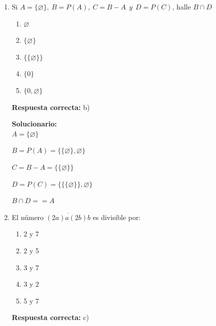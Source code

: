 \begin{enumerate}
	Sea la cantidad repartida
	
	\[
	T
	\left\{
	\begin{array}{c}
		\dfrac{A}{n+1}=\dfrac{B}{n}=\dfrac{C}{n-1}\\
	\end{array}
	\right.
	\]
	
	donde:
	
	$C=44\% (A+B)$
	
	$\dfrac{A+B}{n+1+n}=\dfrac{44\%(A+B)}{n-1}\Rightarrow n=12$
	
	También:
	
	$C=A-200$
	
	$\dfrac{A}{13}=\dfrac{C}{11}=\dfrac{A-C}{13-11}=\dfrac{200}{2}=100$
	
	Luego:
	
	$A=1300;\qquad C=1100\Rightarrow B=1200$
	
	$T=1300+1200+1100=$
	\vspace{6mm}
	
	\item Si $A=\{\varnothing\},\ B=P(A),\ C=B-A\ \ y\ \ D=P(C)$, halle $B\cap D$
	\begin{enumerate}[label=\alph*)]
		\item $\varnothing$
		\item $\{\varnothing\}$
		\item $\{\{\varnothing\}\}$
		\item $\{0\}$
		\item $\{0,\varnothing\}$
	\end{enumerate}
	\textbf{Respuesta correcta:} b)
	
	\vspace{2mm}
	\textbf{Solucionario:}\\
	
	$A=\{\varnothing\}$
	
	$B=P(A)=\{\{\varnothing\},\varnothing\}$
	
	$C=B-A=\{\{\varnothing\}\}$
	
	$D=P(C)=\{\{\{\varnothing\}\},\varnothing\}$
	
	$B\cap D=$\fbox{$\{\varnothing\}$}$=A$
	
	\vspace{6mm}
	
	\item El número $\overline{(2a)a(2b)b}$ es divisible por:
	\begin{enumerate}[label=\alph*)]
		\item 2 y 7
		\item 2 y 5
		\item 3 y 7
		\item 3 y 2
		\item 5 y 7
	\end{enumerate}
	\textbf{Respuesta correcta:} c)
	

\end{enumerate}
